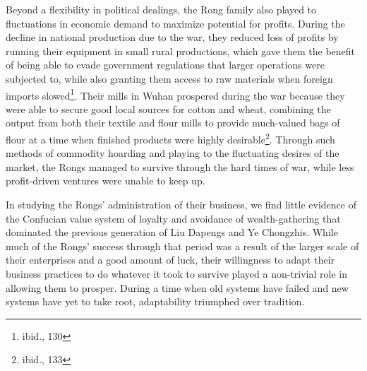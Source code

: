 Beyond a flexibility in political dealings, the Rong family also played to
fluctuations in economic demand to maximize potential for profits. During the
decline in national production due to the war, they reduced  loss of profits by
running their equipment in small rural productions, which gave them the benefit
of being able to evade government regulations that larger operations were
subjected to, while also granting them access to raw materials when foreign
imports slowed\footnote{ibid., 130}. Their mills in Wuhan prospered during the
war because they were able to secure good local sources for cotton and wheat,
combining the output from both their textile and flour mills to provide
much-valued bags of flour at a time when finished products were highly
desirable\footnote{ibid., 133}. Through such methods of commodity hoarding and
playing to the fluctuating desires of the market, the Rongs managed to survive
through the hard times of war, while less profit-driven ventures were unable to
keep up.

In studying the Rongs' administration of their business, we find little evidence
of the Confucian value system of loyalty and avoidance of wealth-gathering that
dominated the previous generation of Liu Dapengs and Ye Chongzhis. While much of
the Rongs' success through that period was a result of the larger scale of their
enterprises and a good amount of luck, their willingness to adapt their business
practices to do whatever it took to survive played a non-trivial role in
allowing them to prosper. During a time when old systems have failed and new
systems have yet to take root, adaptability triumphed over tradition.
